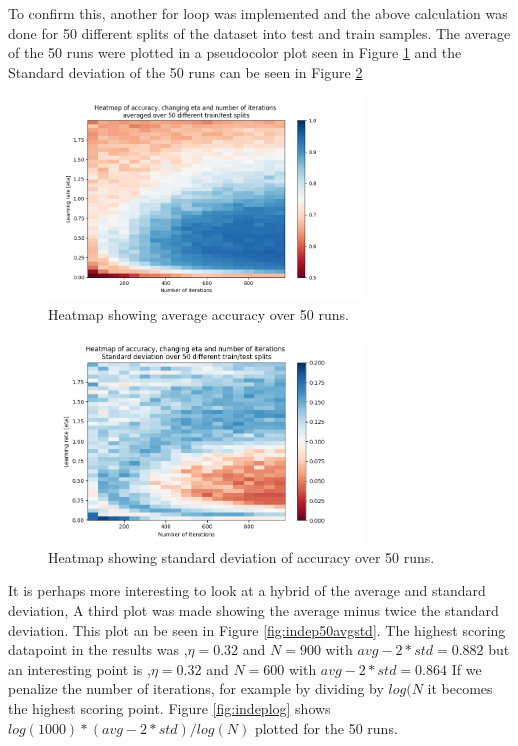 \documentclass{article}
\begin{document}
To confirm this, another for loop was implemented and the above calculation was done for 50 different splits of the dataset into test and train samples. The average of the 50 runs were plotted in a pseudocolor plot seen in Figure \ref{fig:indep50} and the Standard deviation of the 50 runs can be seen in Figure \ref{fig:indep50std}
\begin{figure}[h]
    \centering
    \includegraphics[width=0.75\textwidth]{05_backprop/indep50.png}
    \caption{Heatmap showing average accuracy over 50 runs.}
    \label{fig:indep50}
\end{figure}
\begin{figure}[h]
    \centering
    \includegraphics[width=0.75\textwidth]{05_backprop/indep50std.png}
    \caption{Heatmap showing standard deviation of accuracy over 50 runs.}
    \label{fig:indep50std}
\end{figure}

It is perhaps more interesting to look at a hybrid of the average and standard deviation, A third plot was made showing the average minus twice the standard deviation. This plot an be seen in Figure \ref{fig:indep50avgstd}. The highest scoring datapoint in the results was ,\(\eta=0.32\) and \(N=900\) with \(avg - 2*std = 0.882\) but an interesting point is ,\(\eta=0.32\) and \(N=600\) with \(avg - 2*std = 0.864\) If we penalize the number of iterations, for example by dividing by \(log(N\) it becomes the highest scoring point. Figure \ref{fig:indeplog} shows \(log(1000)*(avg-2*std)/log(N)\) plotted for the 50 runs.
\end{document}
